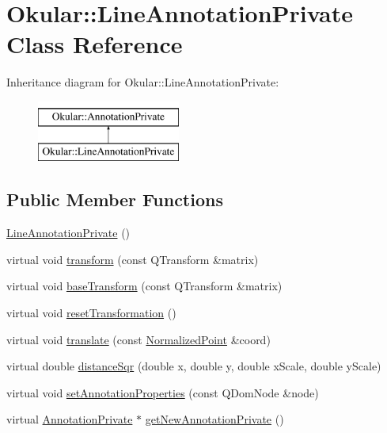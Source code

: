\hypertarget{classOkular_1_1LineAnnotationPrivate}{\section{Okular\+:\+:Line\+Annotation\+Private Class Reference}
\label{classOkular_1_1LineAnnotationPrivate}
}
Inheritance diagram for Okular\+:\+:Line\+Annotation\+Private\+:\begin{figure}[H]
\begin{center}
\leavevmode
\includegraphics[height=2.000000cm]{classOkular_1_1LineAnnotationPrivate}
\end{center}
\end{figure}
\subsection*{Public Member Functions}
\begin{DoxyCompactItemize}
\item 
\hyperlink{classOkular_1_1LineAnnotationPrivate_ac7a466fe56995d2c4f2de2dc73871b1e}{Line\+Annotation\+Private} ()
\item 
virtual void \hyperlink{classOkular_1_1LineAnnotationPrivate_ae76ec496d162f08385ac0ff8effd05d3}{transform} (const Q\+Transform \&matrix)
\item 
virtual void \hyperlink{classOkular_1_1LineAnnotationPrivate_ae28c53c0ca77d4d8c8849d950f191c38}{base\+Transform} (const Q\+Transform \&matrix)
\item 
virtual void \hyperlink{classOkular_1_1LineAnnotationPrivate_aa47e0e7d37cfd1fba25a5499a003a915}{reset\+Transformation} ()
\item 
virtual void \hyperlink{classOkular_1_1LineAnnotationPrivate_a281be34b0d8545034b778f8987c15ed0}{translate} (const \hyperlink{classOkular_1_1NormalizedPoint}{Normalized\+Point} \&coord)
\item 
virtual double \hyperlink{classOkular_1_1LineAnnotationPrivate_ae26622fa2061f8d98cd210d611fc0fc2}{distance\+Sqr} (double x, double y, double x\+Scale, double y\+Scale)
\item 
virtual void \hyperlink{classOkular_1_1LineAnnotationPrivate_a91ac5baeac9854b86ef326f928be0ae9}{set\+Annotation\+Properties} (const Q\+Dom\+Node \&node)
\item 
virtual \hyperlink{classOkular_1_1AnnotationPrivate}{Annotation\+Private} $\ast$ \hyperlink{classOkular_1_1LineAnnotationPrivate_a459d5d0222ba9b0bc17f144aeaedcaf2}{get\+New\+Annotation\+Private} ()
\end{DoxyCompactItemize}
